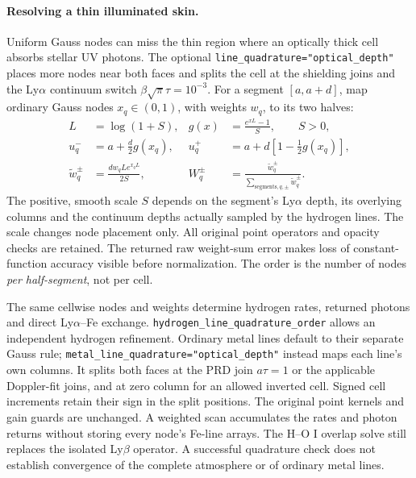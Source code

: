 \documentclass[10pt,a4paper]{article}
\begin{document}
\paragraph{Resolving a thin illuminated skin.}
Uniform Gauss nodes can miss the thin region where an optically thick cell
absorbs stellar UV photons. The optional
\texttt{line\_quadrature="optical\_depth"} places more nodes near both faces
and splits the cell at the shielding joins and the Ly$\alpha$ continuum
switch $\beta\sqrt\pi\tau=10^{-3}$. For a segment $[a,a+d]$, map ordinary
Gauss nodes $x_q\in(0,1)$, with weights $w_q$, to its two halves:
\begin{align}
 L&=\log(1+S),& g(x)&=\frac{e^{xL}-1}{S},\qquad S>0,\nonumber\\
 u_q^-&=a+\frac d2g(x_q),&
 u_q^+&=a+d\left[1-\frac12g(x_q)\right],\nonumber\\
 \widetilde w_q^\pm&=\frac{dw_qL e^{x_qL}}{2S},&
 W_q^\pm&=\frac{\widetilde w_q^\pm}
                  {\sum_{\text{segments},q,\pm}\widetilde w_q^\pm}.
 \label{eq:optical_depth_quadrature}
\end{align}
The positive, smooth scale $S$ depends on the segment's Ly$\alpha$ depth,
its overlying columns and the continuum depths actually sampled by the
hydrogen lines. The scale changes node placement only. All original point
operators and opacity checks are retained. The returned raw weight-sum
error makes loss of constant-function accuracy visible before normalization.
The order is the number of nodes \emph{per half-segment}, not per cell.

The same cellwise nodes and weights determine hydrogen rates, returned
photons and direct Ly$\alpha$--Fe exchange.
\texttt{hydrogen\_line\_quadrature\_order} allows an independent hydrogen
refinement. Ordinary metal lines default to their separate Gauss rule;
\texttt{metal\_line\_quadrature="optical\_depth"} instead maps each line's
own columns. It splits both faces at the PRD join $a\tau=1$ or the applicable
Doppler-fit joins, and at zero column for an allowed inverted cell. Signed
cell increments retain their sign in the split positions. The original
point kernels and gain guards are unchanged. A weighted scan accumulates
the rates and photon returns without storing every node's Fe-line arrays.
The H--O I overlap solve still replaces
the isolated Ly$\beta$ operator. A successful quadrature check does not
establish convergence of the complete atmosphere or of ordinary metal lines.
\end{document}

